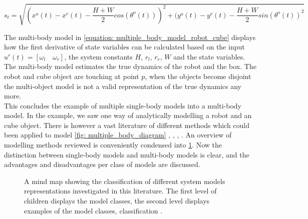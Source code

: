 $$
s_t = \sqrt{(x^o(t)-x^r(t)-\frac{H+W}{2}cos(\theta^o(t)))^2 + (y^o(t)-y^r(t)-\frac{H+W}{2}sin(\theta^o(t))^2}
$$

The multi-body model in \cref{equation: multiple_body_model_robot_cube} displays how the first derivative of state variables can be calculated based on the input $u^r(t) = \left[\omega_l \quad \omega_r \right]$, the system constants $H$, $r_l$, $r_r$, $W$ and the state variables. The multi-body model estimates the true dynamics of the robot and the box. The robot and cube object are touching at point $p$, when the objects become disjoint the multi-object model is not a valid representation of the true dynamics any more. \\

This concludes the example of multiple single-body models into a multi-body model. In the example, we saw one way of analytically modelling a robot and an cube object. There is however a vast literature of different methods which could been applied to model \cref{fig: multiple_body_diagram} \cite{nascimento_nonholonomic_2018}, \cite{bauza_data-efficient_2018}, \cite{stuber_feature-based_2018}, \cite{stuber_lets_2020}. An overview of modelling methods reviewed is conveniently condensed into \cref{mindmap: classify_system_models}. Now the distinction between single-body models and multi-body models is clear, and the advantages and disadvantages per class of models are discussed.

\begin{figure}[h]
\centering
{}
\caption{A mind map showing the classification of different system models representations investigated in this literature. The first level of children displays the model classes, the second level displays examples of the model classes, classification \cite{stuber_lets_2020}.}
\label{mindmap: classify_system_models}
\end{figure}

